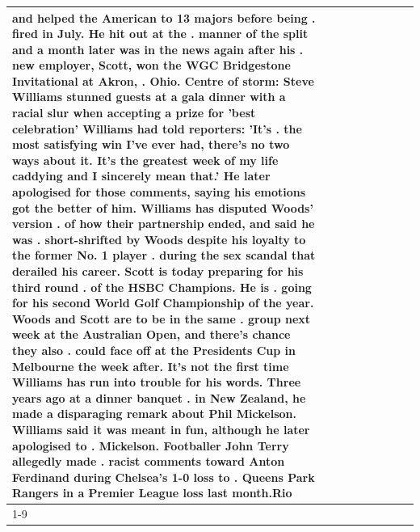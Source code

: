 \begin{table}[H]
\begin{tabular}{lllrlllll}
and helped the American to 13 majors before being . fired in July. He hit out at the . manner of the split and a month later was in the news again after his . new employer, Scott, won the WGC Bridgestone Invitational at Akron, . Ohio. Centre of storm: Steve Williams stunned guests at a gala dinner with a racial slur when accepting a prize for 'best celebration' Williams had told reporters: 'It's . the most satisfying win I've ever had, there's no two ways about it. It's the greatest week of my life caddying and I sincerely mean that.' He later apologised for those comments, saying his emotions got the better of him. Williams has disputed Woods' version . of how their partnership ended, and said he was . short-shrifted by Woods despite his loyalty to the former No. 1 player . during the sex scandal that derailed his career. Scott is today preparing for his third round . of the HSBC Champions. He is . going for his second World Golf Championship of the year. Woods and Scott are to be in the same . group next week at the Australian Open, and there's chance they also . could face off at the Presidents Cup in Melbourne the week after. It's not the first time Williams has run into trouble for his words. Three years ago at a dinner banquet . in New Zealand, he made a disparaging remark about Phil Mickelson. Williams said it was meant in fun, although he later apologised to . Mickelson. Footballer John Terry allegedly made . racist comments toward Anton Ferdinand during Chelsea's 1-0 loss to . Queens Park Rangers in a Premier League loss last month.Rio \\
\cline{1-9}

\end{tabular}
\end{table}
